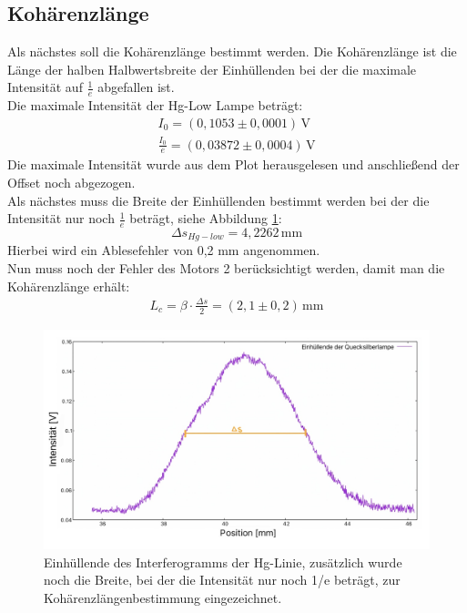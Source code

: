 \subsection{Kohärenzlänge}
Als nächstes soll die Kohärenzlänge bestimmt werden. Die Kohärenzlänge ist die Länge der halben Halbwertsbreite der Einhüllenden bei der
die maximale Intensität auf $\frac{1}{e}$ abgefallen ist.\\
Die maximale Intensität der Hg-Low Lampe beträgt:
\begin{align}
 I_0 = (0,1053 \pm 0,0001)\,\text{V}  \\
 \frac{I_0}{e} = (0,03872 \pm 0,0004)\,\text{V} 
\end{align}
Die maximale Intensität wurde aus dem Plot herausgelesen und anschließend der Offset noch abgezogen.\\
Als nächstes muss die Breite der Einhüllenden bestimmt werden bei der die Intensität nur noch $\frac{1}{e}$
beträgt, siehe Abbildung \ref{fig:Hglowe}:
\begin{equation}
    \Delta s_{Hg-low} = 4,2262\,\text{mm}
\end{equation}
Hierbei wird ein Ablesefehler von 0,2 mm angenommen.\\
Nun muss noch der Fehler des Motors 2 berücksichtigt werden, damit man die Kohärenzlänge erhält:
\begin{align}
    L_c = \beta \cdot \frac{\Delta s}{2} = (2,1 \pm 0,2)\,\text{mm}
\end{align}
\begin{figure}[h]
    \centering
    \includegraphics[scale = 0.33]{Bilder/Anna/low1_e.jpg}
    \caption{Einhüllende des Interferogramms der Hg-Linie, zusätzlich wurde noch die Breite, bei der die Intensität nur noch 1/e beträgt, zur Kohärenzlängenbestimmung eingezeichnet.}
    \label{fig:Hglowe}
\end{figure}
\newpage

